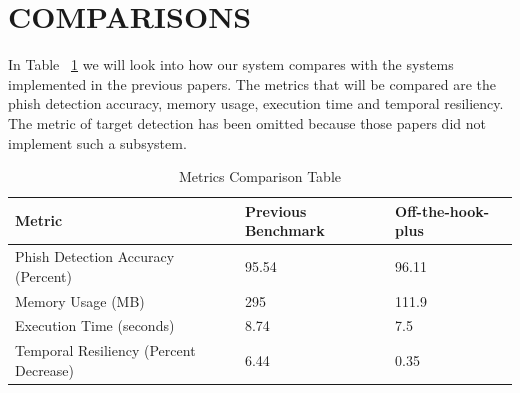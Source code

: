\section{COMPARISONS}
In Table ~\ref{tab:ct2}  we will look into how our system compares with the systems implemented in the previous papers. The metrics that will be compared are the phish detection accuracy, memory usage, execution time and temporal resiliency. The metric of target detection has been omitted because those papers did not implement such a subsystem.

\begin{table}[h!]
\caption{Metrics Comparison Table}
\centering
    \begin{tabular}{ |m{4cm}|m{5cm}|m{5cm}| }
    \hline
    Metric & Previous Benchmark & Off-the-hook-plus \\ \hline
    Phish Detection Accuracy (Percent) & 95.54 & 96.11 \\ \hline
    Memory Usage (MB) & 295 & 111.9 \\ \hline
   Execution Time (seconds) & 8.74 & 7.5 \\ \hline
    Temporal Resiliency (Percent Decrease) & 6.44 & 0.35 \\ \hline
    \end{tabular}
\label{tab:ct2}
\end{table}








